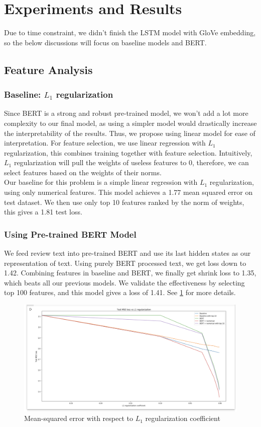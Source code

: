 \documentclass{article}
\begin{document}
\section{Experiments and Results}
Due to time constraint, we didn't finish the LSTM model with GloVe 
embedding, so the below discussions will focus on baseline models and 
BERT.
\subsection{Feature Analysis}
\subsubsection{Baseline: $L_1$ regularization}
Since BERT is a strong and robust pre-trained model, we won’t add a lot more complexity to our final model, as using a simpler model would drastically increase the interpretability of the results. Thus, we propose using linear model for ease of interpretation. For feature selection, we use linear regression with $L_1$ regularization, this combines training together with feature selection.  Intuitively, $L_1$ regularization will pull the weights of useless features to 0, therefore, we can select features based on the weights of their norms.\cite{1} \\

Our baseline for this problem is a simple linear regression with $L_1$ regularization, using only numerical features. This model achieves a 1.77 mean squared error on test dataset. We then use only top 10 features ranked by the norm of weights, this gives a 1.81 test loss.

\subsubsection{Using Pre-trained BERT Model}
 We feed review text into pre-trained BERT and use its last hidden states as our representation of text. Using purely BERT processed text, we get loss down to 1.42. Combining features in baseline and BERT, we finally get shrink loss to 1.35, which beats all our previous models. We validate the effectiveness by selecting top 100 features, and this model gives a loss of 1.41. See \ref{fig2} for more details.
\begin{figure}
\label{fig2}
\begin{center}
\includegraphics[scale=0.3]{mse_loss_vs_l1}
\caption{Mean-squared error with respect to $L_1$ regularization coefficient}
\end{center}
\end{figure}
\end{document}
